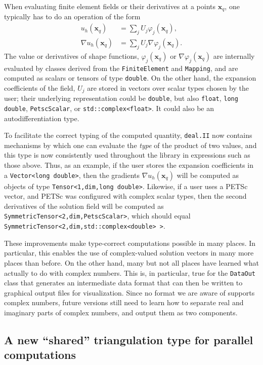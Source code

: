 \documentclass{ansarticle-preprint}
\newcommand{\specialword}[1]{\texttt{#1}}
\newcommand{\dealii}{{\specialword{deal.II}}}
\begin{document}
When evaluating finite element fields or their derivatives at
a points $\mathbf x_q$, one typically has to do an operation of the form
\begin{align*}
  u_h(\mathbf x_q) &= \sum_{j} U_j \varphi_j(\mathbf x_q),
  \\
  \nabla u_h(\mathbf x_q) &= \sum_{j} U_j \nabla\varphi_j(\mathbf x_q).
\end{align*}
The value or derivatives of shape functions, $\varphi_j(\mathbf x_q)$
or $\nabla\varphi_j(\mathbf x_q)$ are internally evaluated by classes
derived from the \texttt{FiniteElement} and \texttt{Mapping}, and are
computed as scalars or tensors of type \texttt{double}. On the other
hand, the expansion coefficients of the field, $U_j$ are stored in
vectors over scalar types chosen by the user; their underlying representation
could be \texttt{double}, but also \texttt{float}, \texttt{long double},
\texttt{PetscScalar}, or \texttt{std::complex<float>}. It could also
be an autodifferentiation type.

To facilitate the correct typing of the computed quantity, \dealii{}
now contains mechanisms by which one can evaluate the \textit{type} of
the product of two values, and this type is now consistently used
throughout the library in expressions such as those above. Thus, as an
example, if the user stores the expansion coefficients in a
\texttt{Vector<long double>}, then the gradients
$\nabla u_h(\mathbf x_q)$ will be computed as objects of type
\texttt{Tensor<1,dim,long double>}. Likewise, if a user uses a PETSc
vector, and PETSc was configured with complex scalar types, then the
second derivatives of the solution field will be computed as
\texttt{SymmetricTensor<2,dim,PetscScalar>}, which should equal
\texttt{SymmetricTensor<2,dim,std::complex<double> >}.

These improvements make type-correct computations possible in many
places. In particular, this enables the use of complex-valued solution
vectors in many more places than before. On the other hand, many but not all
places have learned what actually to do with complex numbers. This is,
in particular, true for the \texttt{DataOut} class that generates an
intermediate data format that can then be written to graphical output
files for visualization. Since no format we are aware of supports
complex numbers, future versions still need to learn how to separate
real and imaginary parts of complex numbers, and output them as two
components.


\subsection{A new ``shared'' triangulation type for parallel computations}
\end{document}
